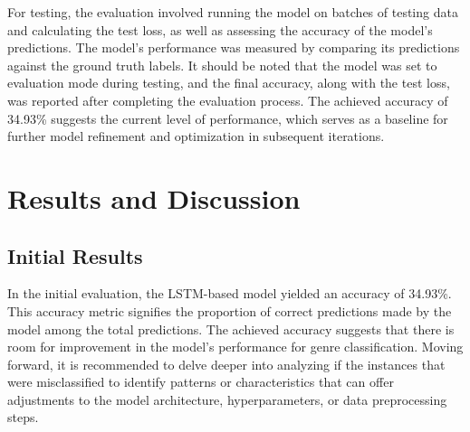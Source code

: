 \documentclass[12pt]{article}
\begin{document}
\vspace{5mm}
\par For testing, the evaluation involved running the model on batches of testing data and calculating the test loss, as well as assessing the accuracy of the model's predictions. The model's performance was measured by comparing its predictions against the ground truth labels. It should be noted that the model was set to evaluation mode during testing, and the final accuracy, along with the test loss, was reported after completing the evaluation process. The achieved accuracy of 34.93\% suggests the current level of performance, which serves as a baseline for further model refinement and optimization in subsequent iterations.


\vspace{5mm}
\newpage
\section{Results and Discussion}
\subsection{Initial Results}
\par In the initial evaluation, the LSTM-based model yielded an accuracy of 34.93\%. This accuracy metric signifies the proportion of correct predictions made by the model among the total predictions. The achieved accuracy suggests that there is room for improvement in the model's performance for genre classification. Moving forward, it is recommended to delve deeper into analyzing if the instances that were misclassified to identify patterns or characteristics that can offer adjustments to the model architecture, hyperparameters, or data preprocessing steps. 
\newpage
\nocite{*}
\printbibliography
\newpage
\end{document}

